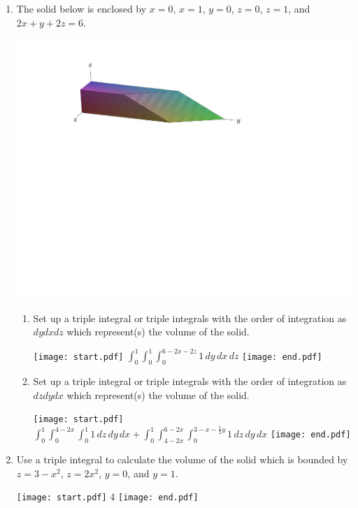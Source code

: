 \documentclass[12pt]{article}
\begin{document}
\begin{enumerate}
\item The solid below is enclosed by $x=0$, $x=1$, $y=0$, $z=0$, $z=1$, and $2x+y+2z=6$.

\begin{center}
\includegraphics[scale=0.7]{volume.pdf}
\end{center}

\begin{enumerate}

\item Set up a triple integral or triple integrals with the order of integration as \underline{$dydxdz$} which represent(s) the volume of the solid.

\texttt{[image: start.pdf]}
{{$\int_0^1 \int_0^1 \int_0^{6-2x-2z} 1 \,dy\,dx\,dz$}}
\texttt{[image: end.pdf]}


\item Set up a triple integral or triple integrals with the order of integration as \underline{$dzdydx$} which represent(s) the volume of the solid.

\texttt{[image: start.pdf]}
{{$\int_0^1 \int_0^{4-2x} \int_0^{1} 1 \,dz\,dy\,dx+\int_0^1 \int_{4-2x}^{6-2x} \int_0^{3-x-\frac{1}{2}y} 1 \,dz\,dy\,dx$}}
\texttt{[image: end.pdf]}


\end{enumerate}

\item Use a triple integral to calculate the volume of the solid which is bounded by $z=3-x^2$, $z=2x^2$, $y=0$, and $y=1$.

\texttt{[image: start.pdf]}
{{4}}
\texttt{[image: end.pdf]}



\end{enumerate}
\end{document}
